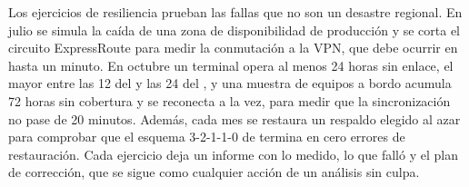 Los ejercicios de resiliencia prueban las fallas que no son un desastre regional. En julio se simula la
caída de una zona de disponibilidad de producción y se corta el circuito ExpressRoute para medir la conmutación a la
VPN, que debe ocurrir en hasta un minuto. En octubre un terminal opera al menos 24 horas sin enlace, el mayor
entre las 12 del  y las 24 del , y una muestra de equipos a bordo acumula 72 horas sin cobertura y se reconecta a la
vez, para medir que la sincronización no pase de 20 minutos. Además, cada mes se restaura un respaldo
elegido al azar para comprobar que el esquema 3-2-1-1-0 de  termina en cero errores
de restauración. Cada ejercicio deja un informe con lo medido, lo que falló y el plan de corrección, que
se sigue como cualquier acción de un análisis sin culpa.
